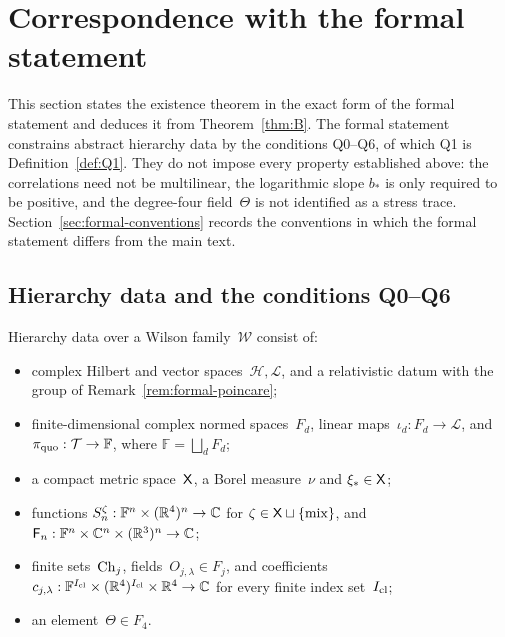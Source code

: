 \section{Correspondence with the formal statement}\label{sec:correspondence}

This section states the existence theorem in the exact form of the formal statement and deduces it from Theorem~\ref{thm:B}. The formal statement constrains abstract hierarchy data by the conditions Q0--Q6, of which Q1 is Definition~\ref{def:Q1}. They do not impose every property established above: the correlations need not be multilinear, the logarithmic slope $b_*$ is only required to be positive, and the degree-four field~$\Theta$ is not identified as a stress trace. Section~\ref{sec:formal-conventions} records the conventions in which the formal statement differs from the main text.

\subsection{Hierarchy data and the conditions Q0--Q6}\label{sec:hierarchy-data}

\begin{definition}\label{def:Q0}
Hierarchy data over a Wilson family~$\mathcal W$ consist of:
\begin{itemize}[nosep]
\item complex Hilbert and vector spaces~$\mathcal H,\mathcal L$, and a relativistic datum with the group of Remark~\ref{rem:formal-poincare};
\item finite-dimensional complex normed spaces~$F_d$, linear maps~$\iota_d:F_d\to\mathcal L$, and $\pi_{\rm quo}:\mathcal T\to\mathbb F$, where $\mathbb F=\bigsqcup_dF_d$;
\item a compact metric space~$\mathsf{X}$, a Borel measure~$\nu$ and $\xi_*\in\mathsf{X}$;
\item functions $S_n^\zeta:\mathbb F^n\times(\mathbb{R}^4)^n\to\mathbb{C}$ for $\zeta\in\mathsf{X}\sqcup\{\mathrm{mix}\}$, and $\mathsf F_n:\mathbb F^n\times\mathbb{C}^n\times(\mathbb{R}^3)^n\to\mathbb{C}$;
\item finite sets~$\mathrm{Ch}_{j}$, fields~$O_{j,\lambda}\in F_j$, and coefficients $c_{j,\lambda}:\mathbb F^{I_{\rm cl}}\times(\mathbb{R}^4)^{I_{\rm cl}}\times\mathbb{R}^4\to\mathbb{C}$ for every finite index set~$I_{\rm cl}$;
\item an element~$\Theta\in F_4$.
\end{itemize}
\end{definition}

